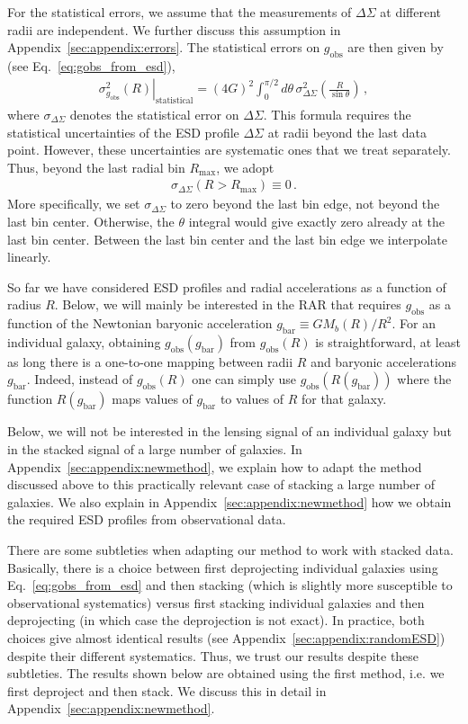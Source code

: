 \documentclass[a4paper,11pt]{article}
\newcommand{\gobs}{\ensuremath{g_{\mathrm{obs}}}}
\newcommand{\gbar}{\ensuremath{g_{\mathrm{bar}}}}
\begin{document}
For the statistical errors, we assume that the measurements of $\Delta \Sigma$ at different radii are independent.
We further discuss this assumption in Appendix~\ref{sec:appendix:errors}.
The statistical errors on $g_{\mathrm{obs}}$ are then given by (see Eq.~\eqref{eq:gobs_from_esd}),
\begin{align}
 \label{eq:stat_err_gobs}
  \left.\sigma^2_{g_{\mathrm{obs}}}(R)\right|_{\mathrm{statistical}} = (4G)^2 \int_0^{\pi/2} d\theta \, \sigma^2_{\Delta \Sigma}\left(\frac{R}{\sin \theta}\right) \,,
\end{align}
where $\sigma_{\Delta \Sigma}$ denotes the statistical error on $\Delta \Sigma$.
This formula requires the statistical uncertainties of the ESD profile $\Delta \Sigma$ at radii beyond the last data point.
However, these uncertainties are systematic ones that we treat separately.
Thus, beyond the last radial bin $R_{\mathrm{max}}$, we adopt
\begin{align}
\sigma_{\Delta \Sigma}(R > R_{\mathrm{max}}) \equiv 0 \,.
\end{align}
More specifically, we set $\sigma_{\Delta \Sigma}$ to zero beyond the last bin edge, not beyond the last bin center.
Otherwise, the $\theta$ integral would give exactly zero already at the last bin center.
Between the last bin center and the last bin edge we interpolate linearly.

So far we have considered ESD profiles and radial accelerations as a function of radius $R$.
Below, we will mainly be interested in the RAR that requires $g_{\mathrm{obs}}$ as a function of the Newtonian baryonic acceleration $\gbar \equiv G M_b(R)/R^2$.
For an individual galaxy, obtaining $\gobs(\gbar)$ from $\gobs(R)$ is straightforward, at least as long there is a one-to-one mapping between radii $R$ and baryonic accelerations $\gbar$.
Indeed, instead of $\gobs(R)$ one can simply use $\gobs(R(\gbar))$ where the function $R(\gbar)$ maps values of $\gbar$ to values of $R$ for that galaxy.

Below, we will not be interested in the lensing signal of an individual galaxy but in the stacked signal of a large number of galaxies.
In Appendix~\ref{sec:appendix:newmethod}, we explain how to adapt the method discussed above to this practically relevant case of stacking a large number of galaxies.
We also explain in Appendix~\ref{sec:appendix:newmethod} how we obtain the required ESD profiles from observational data.

There are some subtleties when adapting our method to work with stacked data.
Basically, there is a choice between first deprojecting individual galaxies using Eq.~\eqref{eq:gobs_from_esd} and then stacking (which is slightly more susceptible to observational systematics) versus first stacking individual galaxies and then deprojecting (in which case the deprojection is not exact).
In practice, both choices give almost identical results (see Appendix~\ref{sec:appendix:randomESD}) despite their different systematics.
Thus, we trust our results despite these subtleties.
The results shown below are obtained using the first method, i.e. we first deproject and then stack.
We discuss this in detail in Appendix~\ref{sec:appendix:newmethod}.
\end{document}
